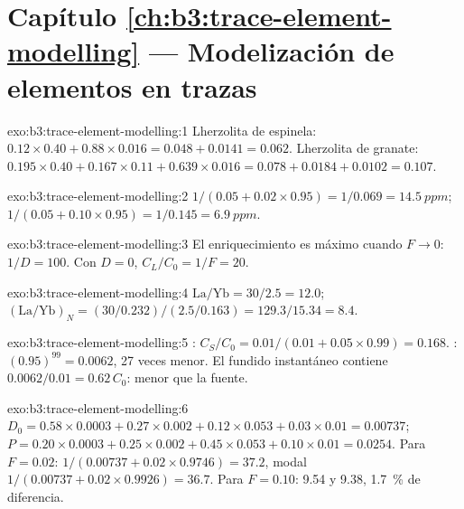 \section*{Capítulo \ref{ch:b3:trace-element-modelling} --- Modelización de elementos en trazas}

\begin{solution}{exo:b3:trace-element-modelling:1}
Lherzolita de espinela: $0.12\times0.40 + 0.88\times0.016 = 0.048 + 0.0141 =
0.062$. Lherzolita de granate: $0.195\times0.40 + 0.167\times0.11 +
0.639\times0.016 = 0.078 + 0.0184 + 0.0102 = 0.107$.
\end{solution}

\begin{solution}{exo:b3:trace-element-modelling:2}
$1/(0.05 + 0.02\times0.95) = 1/0.069 = \qty{14.5}{ppm}$;
$1/(0.05 + 0.10\times0.95) = 1/0.145 = \qty{6.9}{ppm}$.
\end{solution}

\begin{solution}{exo:b3:trace-element-modelling:3}
El enriquecimiento es máximo cuando $F \to 0$: $1/D = 100$. Con $D = 0$,
$C_L/C_0 = 1/F = 20$.
\end{solution}

\begin{solution}{exo:b3:trace-element-modelling:4}
$\mathrm{La/Yb} = 30/2.5 = 12.0$; $(\mathrm{La}/\mathrm{Yb})_N =
(30/0.232)/(2.5/0.163) = 129.3/15.34 = 8.4$.
\end{solution}

\begin{solution}{exo:b3:trace-element-modelling:5}
: $C_S/C_0 = 0.01/(0.01 + 0.05\times0.99) = 0.168$. :
$(0.95)^{99} = 0.0062$, 27 veces menor. El fundido instantáneo contiene
$0.0062/0.01 = 0.62\,C_0$: menor que la fuente.
\end{solution}

\begin{solution}{exo:b3:trace-element-modelling:6}
$D_0 = 0.58\times0.0003 + 0.27\times0.002 + 0.12\times0.053 + 0.03\times0.01
= 0.00737$; $P = 0.20\times0.0003 + 0.25\times0.002 + 0.45\times0.053 +
0.10\times0.01 = 0.0254$. Para $F = 0.02$:  $1/(0.00737 +
0.02\times0.9746) = 37.2$, modal $1/(0.00737 + 0.02\times0.9926) = 36.7$. Para
$F = 0.10$: 9.54 y 9.38, \qty{1.7}{\percent} de diferencia.
\end{solution}


